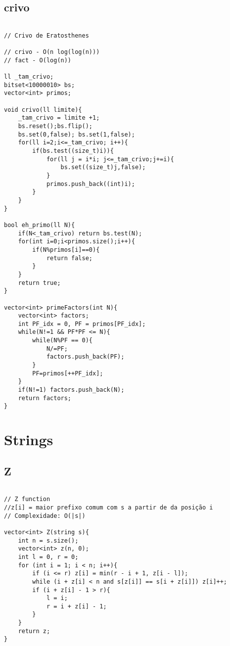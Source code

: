 \documentclass[landscape,twocolumn,10pt,a4paper]{article}
\begin{document}
\subsection{crivo}
\begin{verbatim}

// Crivo de Eratosthenes

// crivo - O(n log(log(n)))
// fact - O(log(n))

ll _tam_crivo;
bitset<10000010> bs;
vector<int> primos;

void crivo(ll limite){
    _tam_crivo = limite +1;
    bs.reset();bs.flip();
    bs.set(0,false); bs.set(1,false);
    for(ll i=2;i<=_tam_crivo; i++){
        if(bs.test((size_t)i)){
            for(ll j = i*i; j<=_tam_crivo;j+=i){
                bs.set((size_t)j,false);
            }
            primos.push_back((int)i);
        }
    }
}

bool eh_primo(ll N){
    if(N<_tam_crivo) return bs.test(N);
    for(int i=0;i<primos.size();i++){
        if(N%primos[i]==0){
            return false;
        }
    }
    return true;
}

vector<int> primeFactors(int N){
    vector<int> factors;
    int PF_idx = 0, PF = primos[PF_idx];
    while(N!=1 && PF*PF <= N){
        while(N%PF == 0){
            N/=PF;
            factors.push_back(PF);
        }
        PF=primos[++PF_idx];
    }
    if(N!=1) factors.push_back(N);
    return factors;
}

\end{verbatim}

\section{Strings}
\subsection{Z}
\begin{verbatim}

// Z function
//z[i] = maior prefixo comum com s a partir de da posição i
// Complexidade: O(|s|)

vector<int> Z(string s){
    int n = s.size();
    vector<int> z(n, 0);
    int l = 0, r = 0;
    for (int i = 1; i < n; i++){
        if (i <= r) z[i] = min(r - i + 1, z[i - l]);
        while (i + z[i] < n and s[z[i]] == s[i + z[i]]) z[i]++;
        if (i + z[i] - 1 > r){
            l = i;
            r = i + z[i] - 1;
        }
    }
    return z;
}
\end{verbatim}
\end{document}
